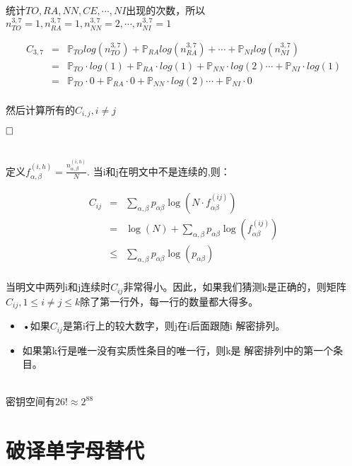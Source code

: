 \documentclass{article}
\begin{document}
统计$TO,RA,NN,CE,\cdots ,NI$出现的次数，所以$n^{3,7}_{TO} = 1,n^{3,7}_{RA} = 1,n^{3,7}_{NN} = 2,\cdots,n^{3,7}_{NI} = 1$


\begin{eqnarray}   
\label{eq}
C_{3,7} &=& \mathbb{P}_{TO}log(n^{3,7}_{TO}) + \mathbb{P}_{RA}log(n^{3,7}_{RA} ) + \cdots + \mathbb{P}_{NI}log(n^{3,7}_{NI}) \nonumber \\ 
&=& \mathbb{P}_{TO}\cdot log(1) + \mathbb{P}_{RA}\cdot log(1) + \mathbb{P}_{NN}\cdot log(2)  \cdots + \mathbb{P}_{NI}\cdot log(1) \nonumber \\ 
&=& \mathbb{P}_{TO} \cdot 0 + \mathbb{P}_{RA}\cdot 0 +\mathbb{P}_{NN} \cdot log(2) \cdots + \mathbb{P}_{NI} \cdot 0\nonumber \\ 
\nonumber
\end{eqnarray}

然后计算所有的$C_{i,j}, i \ne j$

$\hfill\square$ 



~\\

定义$f_{\alpha, \beta}^{(i,h)}=\frac{n_{\alpha, \beta}^{(i,h)}}{N}$. 当i和j在明文中不是连续的,则：


\begin{eqnarray}   
C_{i j} &=&\sum_{\alpha, \beta} p_{\alpha \beta} \log \left(N \cdot f_{\alpha \beta}^{(i j)}\right) \nonumber \\
&=&\log (N)+\sum_{\alpha, \beta} p_{\alpha \beta} \log \left(f_{\alpha \beta}^{(i j)}\right) \nonumber \\ 
& \leq& \sum_{\alpha, \beta} p_{\alpha \beta} \log \left(p_{\alpha \beta}\right)\nonumber \\ 
\end{eqnarray}

当明文中两列i和j连续时$C_{ij}$非常得小。因此，如果我们猜测k是正确的，则矩阵$C_{ij},1 \leq i \ne j\leq k$除了第一行外，每一行的数量都大得多。

\begin{itemize}
\item •如果$C_{ij}$是第i行上的较大数字，则j在i后面跟随i
解密排列。
\item 如果第k行是唯一没有实质性条目的唯一行，则k是
解密排列中的第一个条目。
\end{itemize}

~\\

密钥空间有$26! \approx 2^{88}$

\section{破译单字母替代}
\end{document}

